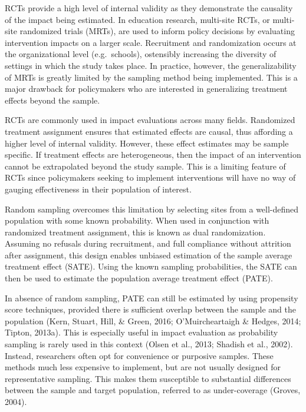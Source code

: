 \documentclass[man,floatsintext]{apa6}
\begin{document}
RCTs provide a high level of internal validity as they demonstrate the causality of the impact being estimated. In education research, multi-site RCTs, or multi-site randomized trials (MRTs), are used to inform policy decisions by evaluating intervention impacts on a larger scale. Recruitment and randomization occurs at the organizational level (e.g.~schools), ostensibly increasing the diversity of settings in which the study takes place. In practice, however, the generalizability of MRTs is greatly limited by the sampling method being implemented. This is a major drawback for policymakers who are interested in generalizing treatment effects beyond the sample.

RCTs are commonly used in impact evaluations across many fields. Randomized treatment assignment ensures that estimated effects are causal, thus affording a higher level of internal validity. However, these effect estimates may be sample specific. If treatment effects are heterogeneous, then the impact of an intervention cannot be extrapolated beyond the study sample. This is a limiting feature of RCTs since policymakers seeking to implement interventions will have no way of gauging effectiveness in their population of interest.

Random sampling overcomes this limitation by selecting sites from a well-defined population with some known probability. When used in conjunction with randomized treatment assignment, this is known as dual randomization. Assuming no refusals during recruitment, and full compliance without attrition after assignment, this design enables unbiased estimation of the sample average treatment effect (SATE). Using the known sampling probabilities, the SATE can then be used to estimate the population average treatment effect (PATE).

In absence of random sampling, PATE can still be estimated by using propensity score techniques, provided there is sufficient overlap between the sample and the population (Kern, Stuart, Hill, \& Green, 2016; O'Muircheartaigh \& Hedges, 2014; Tipton, 2013a). This is especially useful in impact evaluation as probability sampling is rarely used in this context (Olsen et al., 2013; Shadish et al., 2002). Instead, researchers often opt for convenience or purposive samples. These methods much less expensive to implement, but are not usually designed for representative sampling. This makes them susceptible to substantial differences between the sample and target population, referred to as under-coverage (Groves, 2004).
\end{document}
